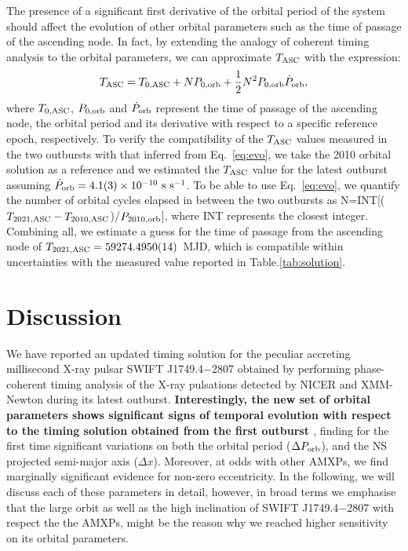 \documentclass[fleqn,usenatbib]{mnras}
\newcommand{\swiftj}{SWIFT J1749.4$-$2807}
\newcommand{\nicer}{NICER}
\newcommand{\xmm}{XMM-Newton}
\begin{document}
The presence of a significant first derivative of the orbital period of the system should affect the evolution of other orbital parameters such as the time of passage of the ascending node. In fact, by extending the analogy of coherent timing analysis to the orbital parameters, we can approximate $T_{\rm ASC}$ with the expression:
\begin{equation}
\label{eq:evo}
T_{\rm ASC}=T_{0,{\rm ASC}}+N P_{0,{\rm orb}}+\frac{1}{2}N^2P_{0,{\rm orb}}\dot{P}_{\rm orb},
\end{equation}
where $T_{0,{\rm ASC}}$, $P_{0,{\rm orb}}$ and $\dot{P}_{\rm orb}$ represent the time of passage of	the ascending node, the orbital period and its derivative with respect to a specific reference epoch, respectively. 
To verify the compatibility of the $T_{\rm ASC}$ values measured in the two outbursts with that inferred from Eq.~\ref{eq:evo}, we take the 2010 orbital solution as a reference and we estimated the $T_{\rm ASC}$ value for the latest outburst assuming $\dot{P}_{\rm orb}=4.1(3)\times 10^{-10}~\text{s}~\text{s}^{-1}$. To be able to use Eq.~\ref{eq:evo}, we quantify the number of orbital cycles elapsed in between the two outbursts as N=INT[($T_{2021,{\rm ASC}}-T_{2010,{\rm ASC}}$)/$P_{2010,{\rm orb}}$], where INT represents the closest integer. Combining all, we estimate a guess for the time of passage from the ascending node of $T_{2021,{\rm ASC}}=59274.4950(14)$~MJD, which is compatible within uncertainties with the measured value reported in Table.\ref{tab:solution}.



\section{Discussion}

We have reported an updated timing solution for the peculiar accreting millisecond X-ray pulsar \swiftj{} obtained by performing phase-coherent timing analysis of the X-ray pulsations detected by \nicer{} and \xmm{} during its latest outburst. \textbf{Interestingly, the new set of orbital parameters shows significant signs of temporal evolution with respect to the timing solution obtained from the first outburst \citep[see also][]{Markwardt:2010tl,Altamirano:2011uq,Ferrigno:2011wz}}, finding for the first time significant variations on both the orbital period ($\Delta P_{\rm orb}$), and the NS projected semi-major axis ($\Delta x$). Moreover, at odds with other AMXPs, we find marginally significant evidence for non-zero eccentricity. In the following, we will discuss each of these parameters in detail, however, in broad terms we emphasise that the large orbit as well as the high inclination of \swiftj{} with respect the the AMXPs, might be the reason why we reached higher sensitivity on its orbital parameters.  
\end{document}
